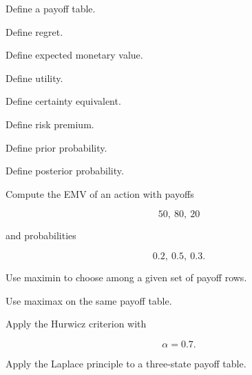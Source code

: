 \begin{exercise}[1]
Define a payoff table.
\end{exercise}

\begin{exercise}[1]
Define regret.
\end{exercise}

\begin{exercise}[1]
Define expected monetary value.
\end{exercise}

\begin{exercise}[1]
Define utility.
\end{exercise}

\begin{exercise}[1]
Define certainty equivalent.
\end{exercise}

\begin{exercise}[1]
Define risk premium.
\end{exercise}

\begin{exercise}[1]
Define prior probability.
\end{exercise}

\begin{exercise}[1]
Define posterior probability.
\end{exercise}

\begin{exercise}[2]
Compute the EMV of an action with payoffs

\[
50,\ 80,\ 20
\]

and probabilities

\[
0.2,\ 0.5,\ 0.3.
\]
\end{exercise}

\begin{exercise}[2]
Use maximin to choose among a given set of payoff rows.
\end{exercise}

\begin{exercise}[2]
Use maximax on the same payoff table.
\end{exercise}

\begin{exercise}[2]
Apply the Hurwicz criterion with

\[
\alpha=0.7.
\]
\end{exercise}

\begin{exercise}[2]
Apply the Laplace principle to a three-state payoff table.
\end{exercise}

